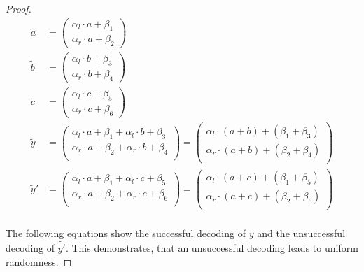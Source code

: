 \begin{proof}
  \begin{align*}
    \widetilde{a} &=
    \begin{pmatrix}
      \alpha_l \cdot a + \beta_1\\
      \alpha_r \cdot a + \beta_2
    \end{pmatrix}\\
    \widetilde{b} &=
    \begin{pmatrix}
      \alpha_l \cdot b + \beta_3\\
      \alpha_r \cdot b + \beta_4
    \end{pmatrix}\\
    \widetilde{c} &=
    \begin{pmatrix}
      \alpha_l \cdot c + \beta_5\\
      \alpha_r \cdot c + \beta_6
    \end{pmatrix}\\
    \widetilde{y} &=
    \begin{pmatrix}
      \alpha_l \cdot a + \beta_1 + \alpha_l \cdot b + \beta_3\\
      \alpha_r \cdot a + \beta_2 + \alpha_r \cdot b + \beta_4\\
    \end{pmatrix} =
    \begin{pmatrix}
      \alpha_l \cdot (a+b) + (\beta_1 + \beta_3)\\
      \alpha_r \cdot (a+b) + (\beta_2 + \beta_4)\\
    \end{pmatrix}\\
    \widetilde{y}' &=
    \begin{pmatrix}
      \alpha_l \cdot a + \beta_1 + \alpha_l \cdot c + \beta_5\\
      \alpha_r \cdot a + \beta_2 + \alpha_r \cdot c + \beta_6\\
    \end{pmatrix} =
    \begin{pmatrix}
      \alpha_l \cdot (a+c) + (\beta_1 + \beta_5)\\
      \alpha_r \cdot (a+c) + (\beta_2 + \beta_6)\\
    \end{pmatrix}\\
  \end{align*}

  \noindent{}The following equations show the successful decoding of
  $\widetilde{y}$ and the unsuccessful decoding of $\widetilde{y'}$. This
  demonstrates, that an unsuccessful decoding leads to uniform randomness.


\end{proof}
